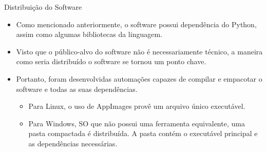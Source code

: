 \begin{frame}{Distribuição do Software}
    \begin{itemize}
        \item Como mencionado anteriormente, o software possui dependência do Python, assim como algumas bibliotecas da linguagem.
        \item Visto que o público-alvo do software não é necessariamente técnico, a maneira como seria distribuído o software se tornou um ponto chave.
        \item Portanto, foram desenvolvidas automações capazes de compilar e empacotar o software e todas as suas dependências.
        \begin{itemize}
            \item Para Linux, o uso de AppImages provê um arquivo único executável.
            \item Para Windows, SO que não possui uma ferramenta equivalente, uma pasta compactada é distribuída. A pasta contém o executável principal e as dependências necessárias.
        \end{itemize}
    \end{itemize}
\end{frame}
